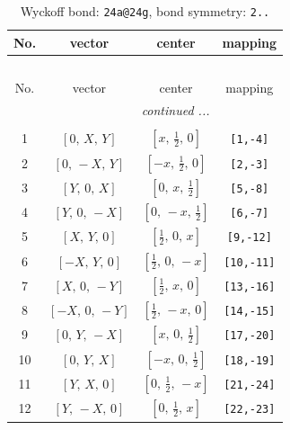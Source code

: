 \documentclass[fleqn,8pt]{jsarticle}
\begin{document}
\begin{longtable}{cccc}
\caption{Wyckoff bond: {\tt 24a@24g}, bond symmetry: {\tt 2..}}
 \\
 \hline \hline
No. & vector & center & mapping \\ \hline \endfirsthead

\multicolumn{3}{l}{\tablename\ \thetable{}} \\
 \hline \hline
No. & vector & center & mapping \\ \hline \endhead

 \hline \hline
\multicolumn{3}{r}{\footnotesize\it continued ...} \\ \endfoot

 \hline \hline
\multicolumn{3}{r}{} \\ \endlastfoot

1 & $\left[ 0,\, X,\, Y \right]$ & $\left[ x,\, \frac{1}{2},\, 0 \right]$ & {\tt [1,-4]} \\ \hline
2 & $\left[ 0,\, - X,\, Y \right]$ & $\left[ - x,\, \frac{1}{2},\, 0 \right]$ & {\tt [2,-3]} \\ \hline
3 & $\left[ Y,\, 0,\, X \right]$ & $\left[ 0,\, x,\, \frac{1}{2} \right]$ & {\tt [5,-8]} \\ \hline
4 & $\left[ Y,\, 0,\, - X \right]$ & $\left[ 0,\, - x,\, \frac{1}{2} \right]$ & {\tt [6,-7]} \\ \hline
5 & $\left[ X,\, Y,\, 0 \right]$ & $\left[ \frac{1}{2},\, 0,\, x \right]$ & {\tt [9,-12]} \\ \hline
6 & $\left[ - X,\, Y,\, 0 \right]$ & $\left[ \frac{1}{2},\, 0,\, - x \right]$ & {\tt [10,-11]} \\ \hline
7 & $\left[ X,\, 0,\, - Y \right]$ & $\left[ \frac{1}{2},\, x,\, 0 \right]$ & {\tt [13,-16]} \\ \hline
8 & $\left[ - X,\, 0,\, - Y \right]$ & $\left[ \frac{1}{2},\, - x,\, 0 \right]$ & {\tt [14,-15]} \\ \hline
9 & $\left[ 0,\, Y,\, - X \right]$ & $\left[ x,\, 0,\, \frac{1}{2} \right]$ & {\tt [17,-20]} \\ \hline
10 & $\left[ 0,\, Y,\, X \right]$ & $\left[ - x,\, 0,\, \frac{1}{2} \right]$ & {\tt [18,-19]} \\ \hline
11 & $\left[ Y,\, X,\, 0 \right]$ & $\left[ 0,\, \frac{1}{2},\, - x \right]$ & {\tt [21,-24]} \\ \hline
12 & $\left[ Y,\, - X,\, 0 \right]$ & $\left[ 0,\, \frac{1}{2},\, x \right]$ & {\tt [22,-23]} \\
\end{longtable}
\end{document}
